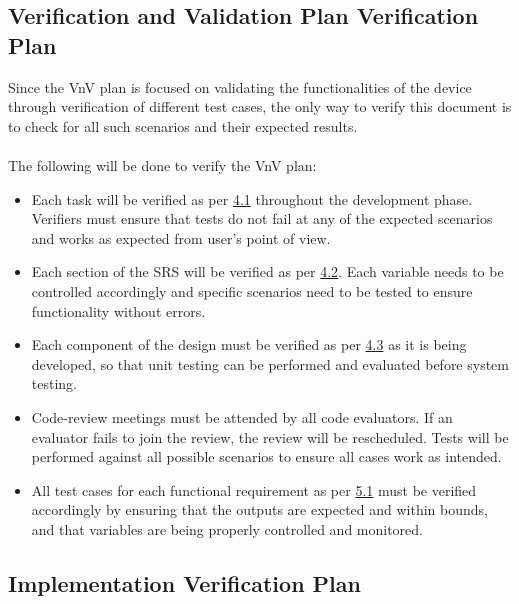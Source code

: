 \documentclass[12pt, titlepage]{article}
\begin{document}
\pagebreak
\subsection{Verification and Validation Plan Verification Plan}

Since the VnV plan is focused on validating the functionalities of the device through verification of different test cases, the only way to verify this document is to check for all such scenarios and their expected results.\\
\\The following will be done to verify the VnV plan:\\
\begin{itemize}
  \item[\ding{111}] Each task will be verified as per \hyperref[4_1]{4.1} throughout the development phase. Verifiers must ensure that tests do not fail at any of the expected scenarios and works as expected from user's point of view.
  \item[\ding{111}] Each section of the SRS will be verified as per \hyperref[SRS_verification]{4.2}. Each variable needs to be controlled accordingly and specific scenarios need to be tested to ensure functionality without errors.
  \item[\ding{111}] Each component of the design must be verified as per \hyperref[sec_4_3]{4.3} as it is being developed, so that unit testing can be performed and evaluated before system testing.
  \item[\ding{111}] Code-review meetings must be attended by all code evaluators. If an evaluator fails to join the review, the review will be rescheduled. Tests will be performed against all possible scenarios to ensure all cases work as intended.
  \item[\ding{111}] All test cases for each functional requirement as per \hyperref[sec_5_1]{5.1} must be verified accordingly by ensuring that the outputs are expected and within bounds, and that variables are being properly controlled and monitored.
\end{itemize}

\subsection{Implementation Verification Plan}
\end{document}
